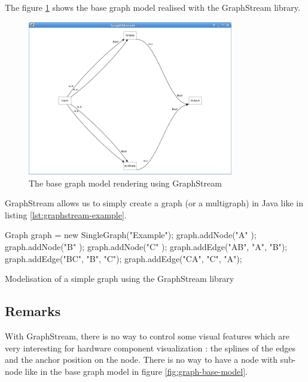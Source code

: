 The figure \ref{fig:base-graph-model-graphstream} shows the base graph model
realised with the GraphStream library.

\begin{figure}[H]
  \centering
  \includegraphics[width=0.8\textwidth]{img/graphstream-base-model-example}
  \caption{The base graph model rendering using GraphStream}
  \label{fig:base-graph-model-graphstream}
\end{figure}

GraphStream allows us to simply create a graph (or a multigraph) in Java like in
listing \ref{lst:graphstream-example}.

\begin{listing}[H]
  \centering
  \begin{javacode}
  Graph graph = new SingleGraph("Example");
  graph.addNode("A" );
  graph.addNode("B" );
  graph.addNode("C" );
  graph.addEdge("AB", "A", "B");
  graph.addEdge("BC", "B", "C");
  graph.addEdge("CA", "C", "A");
  \end{javacode}
  \caption[A simple graph modelisation using GraphStream]{Modelisation of a
    simple graph using the GraphStream library}
  \label{lst:graphstream-example}
\end{listing}

\subsection{Remarks}
\label{sub:Remarks}

With GraphStream, there is no way to control some visual features which are very
interesting for hardware component visualization : the splines of the edges and
the anchor position on the node. There is no way to have a node with sub-node
like in the base graph model in figure \ref{fig:graph-base-model}.

